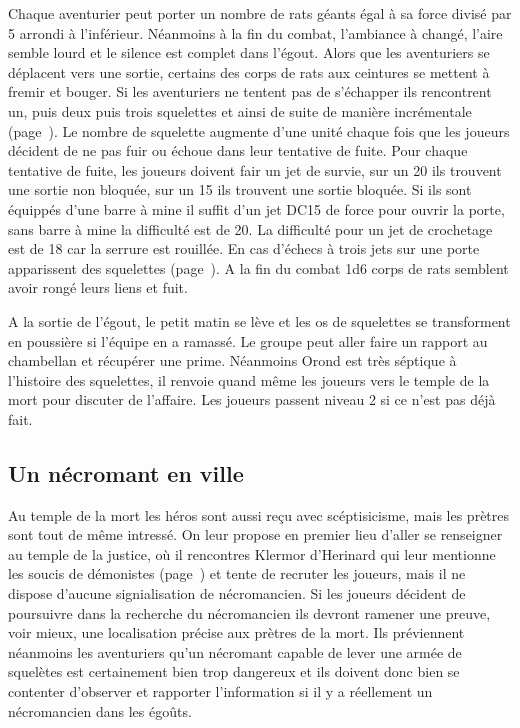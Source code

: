 Chaque aventurier peut porter un nombre de rats géants égal à sa force divisé par 5 arrondi à l'inférieur.
Néanmoins à la fin du combat, l'ambiance à changé, l'aire semble lourd et le silence est complet dans 
l'égout. Alors que les aventuriers se déplacent vers une sortie, certains des corps 
de rats aux ceintures se mettent à fremir et bouger. Si les aventuriers ne tentent pas de s'échapper 
ils rencontrent un, puis deux puis trois squelettes et ainsi de suite de manière incrémentale 
(page~\pageref{Squelette}). Le nombre de squelette augmente d'une unité chaque fois que les joueurs 
décident de ne pas fuir ou échoue dans leur tentative de fuite. Pour chaque tentative de fuite, les 
joueurs doivent fair un jet de survie, sur un 20 ils trouvent une sortie non bloquée, sur un 15 ils trouvent
une sortie bloquée. Si ils sont équippés d'une barre à mine il suffit d'un jet DC15 de force pour 
ouvrir la porte, sans barre à mine la difficulté est de 20. La difficulté pour un jet de crochetage est de 
18 car la serrure est rouillée. En cas d'échecs à trois jets sur une porte apparissent des squelettes
(page~\pageref{Squelette}). A la fin du combat 1d6 corps de rats semblent avoir rongé leurs liens et fuit. 

A la sortie de l'égout, le petit matin se lève et les os de squelettes se transforment en poussière si 
l'équipe en a ramassé. Le groupe peut aller faire un rapport au chambellan et récupérer une prime. 
Néanmoins Orond est très séptique à l'histoire des squelettes, il renvoie quand même les joueurs vers 
le temple de la mort pour discuter de l'affaire. Les joueurs passent niveau 2 si ce n'est pas déjà fait.

\subsection{Un nécromant en ville}

Au temple de la mort les héros sont aussi reçu avec scéptisicisme, mais les prètres sont tout de même
intressé. On leur propose en premier lieu d'aller se renseigner au temple de la justice, où il rencontres
Klermor d'Herinard qui leur mentionne les soucis de démonistes (page~\pageref{Demoniste}) et tente de 
recruter les joueurs, mais il ne dispose d'aucune signialisation de nécromancien. Si les joueurs décident
de poursuivre dans la recherche du nécromancien ils devront ramener une preuve, voir mieux, une 
localisation précise aux prètres de la mort. Ils préviennent néanmoins les aventuriers qu'un nécromant 
capable de lever une armée de squelètes est certainement bien trop dangereux et ils doivent donc bien
se contenter d'observer et rapporter l'information si il y a réellement un nécromancien dans les égoûts.

